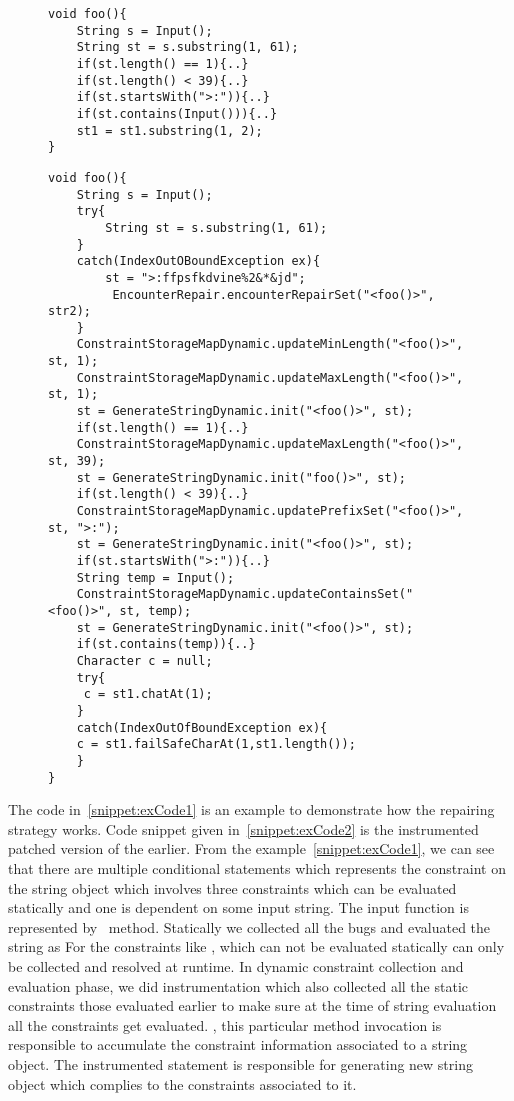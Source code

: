 

\lstset{language=Java, caption=Repairing strategy example, label = snippet:exCode1}
\begin{figure}[t]
\begin{lstlisting}
void foo(){
	String s = Input();
	String st = s.substring(1, 61);	
	if(st.length() == 1){..}
	if(st.length() < 39){..}
	if(st.startsWith(">:")){..}
	if(st.contains(Input())){..}
	st1 = st1.substring(1, 2);
}
\end{lstlisting}
\end{figure}

\lstset{language=Java, caption=Repairing strategy Instrumentation example, label = snippet:exCode2}
\begin{figure}[t]
\begin{lstlisting}
void foo(){
	String s = Input();
	try{
		String st = s.substring(1, 61);
	}
	catch(IndexOutOBoundException ex){
		st = ">:ffpsfkdvine%2&*&jd";
		 EncounterRepair.encounterRepairSet("<foo()>", str2);
	}
	ConstraintStorageMapDynamic.updateMinLength("<foo()>", st, 1);
	ConstraintStorageMapDynamic.updateMaxLength("<foo()>", st, 1);
	st = GenerateStringDynamic.init("<foo()>", st);	
	if(st.length() == 1){..}
	ConstraintStorageMapDynamic.updateMaxLength("<foo()>", st, 39);
	st = GenerateStringDynamic.init("foo()>", st);
	if(st.length() < 39){..}
	ConstraintStorageMapDynamic.updatePrefixSet("<foo()>", st, ">:");
	st = GenerateStringDynamic.init("<foo()>", st);
	if(st.startsWith(">:")){..}
	String temp = Input();
	ConstraintStorageMapDynamic.updateContainsSet("<foo()>", st, temp);
	st = GenerateStringDynamic.init("<foo()>", st);
	if(st.contains(temp)){..}
	Character c = null;
	try{
	 c = st1.chatAt(1);
	}
	catch(IndexOutOfBoundException ex){
	c = st1.failSafeCharAt(1,st1.length());
	}
}
\end{lstlisting}
\end{figure}

The code in~\ref{snippet:exCode1} is an example to demonstrate how the repairing strategy
works. Code snippet given in~\ref{snippet:exCode2} is the instrumented patched version of
the earlier. From the example~\ref{snippet:exCode1}, we can see that there are multiple 
conditional statements which represents the constraint on the string object  which
involves three constraints which can be evaluated statically and one is dependent on some
input string. The input function is represented by~ method. Statically we
collected all the bugs and evaluated the string as  
For the constraints like , which can not be evaluated statically
can only be collected and resolved at runtime. In dynamic constraint collection and evaluation 
phase, we did instrumentation which also collected all the static constraints those evaluated
earlier to make sure at the time of string evaluation all the constraints get evaluated.
, this particular
method invocation is responsible to accumulate the constraint information associated
to a string object. The instrumented statement 
is responsible for generating new string object which complies to the constraints 
associated to it.


